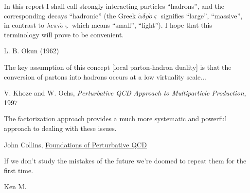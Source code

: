 \epigraph{
In this report I shall call strongly interacting particles ``hadrons'', and the corresponding decays ``hadronic'' (the Greek \(\acute{\alpha}\delta \rho \acute{o}\varsigma\) signifies ``large'', ``massive'', in contrast to \(\lambda \epsilon \pi \tau \acute{o} \varsigma\) which means ``small'', ``light''). I hope that this terminology will prove to be convenient.}{L. B. Okun (1962)}

\vspace{-15pt}

\epigraph{
    The key assumption of this concept [local parton-hadron duality] is that the conversion of partons into hadrons occurs at a low virtuality scale...
}
{V. Khoze and W. Ochs, \textit{Perturbative QCD Approach to Multiparticle Production}, 1997 \cite{Khoze:1996dn}}

\vspace{-15pt}


\epigraph{The factorization approach provides a much more systematic and powerful approach to dealing with these issues.}{John Collins, \underline{Foundations of Perturbative QCD} \cite{Collins:2011zzd}}


\vspace{-15pt}


\epigraph{If we don't study the mistakes of the future we're doomed to repeat them for the first time.}{Ken M.}



\iffalse
\epigraph{
    A short time scale, of the order of the inverse of the large momenta in the process, characterizes the hard collisions of the constituents.
    A long time scale, of the order of the typical hadron radius, characterizes the binding and recombination of the constituents.
    The short time scale physics depends on the process, but is calculable.
    The long time scale physics contains all the complexity of the bound state problem, but it is independent of the process.
}
{
        \textit{Perturbation Theory and the Parton Model in QCD} (1978),
    R.K Ellis, H. Georgi, M. Machacek, H.D. Politzer, G.G. Ross
}
\fi


